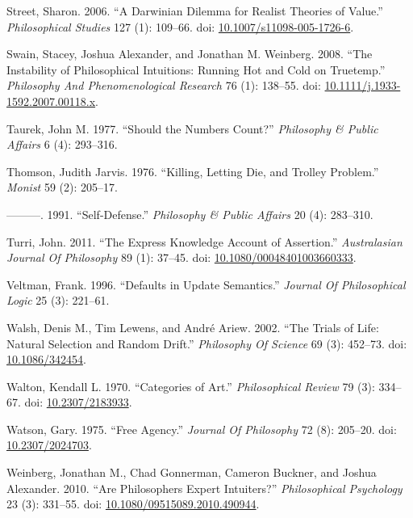 \documentclass[
  10pt,
  letterpaper,
  DIV=11,
  numbers=noendperiod,
  twoside]{scrartcl}
\newlength{\cslhangindent}
\newenvironment{CSLReferences}[2] %
 {\begin{list}{}{%
  \setlength{\itemindent}{0pt}
  \setlength{\leftmargin}{0pt}
  \setlength{\parsep}{0pt}
  \ifodd #1
   \setlength{\leftmargin}{\cslhangindent}
   \setlength{\itemindent}{-1\cslhangindent}
  \fi
  \setlength{\itemsep}{#2\baselineskip}}}
 {\end{list}}
\begin{document}
\begin{CSLReferences}{1}{0}
Street, Sharon. 2006. {``A Darwinian Dilemma for Realist Theories of
Value.''} \emph{Philosophical Studies} 127 (1): 109--66. doi:
\href{https://doi.org/10.1007/s11098-005-1726-6}{10.1007/s11098-005-1726-6}.

Swain, Stacey, Joshua Alexander, and Jonathan M. Weinberg. 2008. {``The
Instability of Philosophical Intuitions: Running Hot and Cold on
Truetemp.''} \emph{Philosophy And Phenomenological Research} 76 (1):
138--55. doi:
\href{https://doi.org/10.1111/j.1933-1592.2007.00118.x}{10.1111/j.1933-1592.2007.00118.x}.

Taurek, John M. 1977. {``Should the Numbers Count?''} \emph{Philosophy
\& Public Affairs} 6 (4): 293--316.

Thomson, Judith Jarvis. 1976. {``Killing, Letting Die, and Trolley
Problem.''} \emph{Monist} 59 (2): 205--17.

---------. 1991. {``Self-Defense.''} \emph{Philosophy \& Public Affairs}
20 (4): 283--310.

Turri, John. 2011. {``The Express Knowledge Account of Assertion.''}
\emph{Australasian Journal Of Philosophy} 89 (1): 37--45. doi:
\href{https://doi.org/10.1080/00048401003660333}{10.1080/00048401003660333}.

Veltman, Frank. 1996. {``Defaults in Update Semantics.''} \emph{Journal
Of Philosophical Logic} 25 (3): 221--61.

Walsh, Denis M., Tim Lewens, and André Ariew. 2002. {``The Trials of
Life: Natural Selection and Random Drift.''} \emph{Philosophy Of
Science} 69 (3): 452--73. doi:
\href{https://doi.org/10.1086/342454}{10.1086/342454}.

Walton, Kendall L. 1970. {``Categories of Art.''} \emph{Philosophical
Review} 79 (3): 334--67. doi:
\href{https://doi.org/10.2307/2183933}{10.2307/2183933}.

Watson, Gary. 1975. {``Free Agency.''} \emph{Journal Of Philosophy} 72
(8): 205--20. doi:
\href{https://doi.org/10.2307/2024703}{10.2307/2024703}.

Weinberg, Jonathan M., Chad Gonnerman, Cameron Buckner, and Joshua
Alexander. 2010. {``Are Philosophers Expert Intuiters?''}
\emph{Philosophical Psychology} 23 (3): 331--55. doi:
\href{https://doi.org/10.1080/09515089.2010.490944}{10.1080/09515089.2010.490944}.


\end{CSLReferences}
\end{document}
